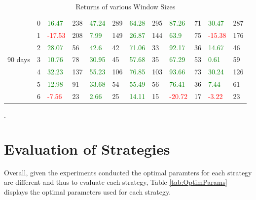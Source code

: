 \begin{table}[!htb]
\begin{adjustwidth}{-0.8in}{-0.9in}
\begin{tabular}{|p{4em}|p{2em}|p{3em}|p{3em}|p{3em}|p{3em}|p{3em}|p{3em}|p{3em}|p{3em}|p{3em}|p{3em}|}
            & 0 & \textcolor{green}{16.47} & 238 & \textcolor{green}{47.24} & 289 & \textcolor{green}{64.28} & 295 & \textcolor{green}{87.26} & 71 & \textcolor{green}{30.47} & 287\\\cline{3-12}
            & 1 & \textcolor{red}{-17.53} & 208 & \textcolor{green}{7.99} & 149 & \textcolor{green}{26.87} & 144 & \textcolor{green}{63.9} & 75 & \textcolor{red}{-15.38} & 176\\\cline{3-12}
            & 2 & \textcolor{green}{28.07} & 56 & \textcolor{green}{42.6} & 42 & \textcolor{green}{71.06} & 33 & \textcolor{green}{92.17} & 36 & \textcolor{green}{14.67} & 46\\\cline{3-12}
            90 days & 3 & \textcolor{green}{10.76} & 78 & \textcolor{green}{30.95} & 45 & \textcolor{green}{57.68} & 35 & \textcolor{green}{67.29} & 53 & \textcolor{green}{0.61} & 59\\\cline{3-12}
            & 4 & \textcolor{green}{32.23} & 137 & \textcolor{green}{55.23} & 106 & \textcolor{green}{76.85} & 103 & \textcolor{green}{93.66} & 73 & \textcolor{green}{30.24} & 126\\\cline{3-12}
            & 5 & \textcolor{green}{12.98} & 91 & \textcolor{green}{33.68} & 54 & \textcolor{green}{55.49} & 56 & \textcolor{green}{76.41} & 36 & \textcolor{green}{7.44} & 61\\\cline{3-12}
            & 6 & \textcolor{red}{-7.56} & 23 & \textcolor{green}{2.66} & 25 & \textcolor{green}{14.11} & 15 & \textcolor{red}{-20.72} & 17 & \textcolor{red}{-3.22} & 23\\\hline
            
        \end{tabular}
    \end{adjustwidth}
    \caption{Returns of various Window Sizes \label{tab:VaryWS}}.
\end{table}


\section{Evaluation of Strategies}
Overall, given the experiments conducted the optimal paramters for each strategy are different and thus to evaluate each strategy, Table \ref{tab:OptimParams} displays the optimal parameters used for each strategy.


